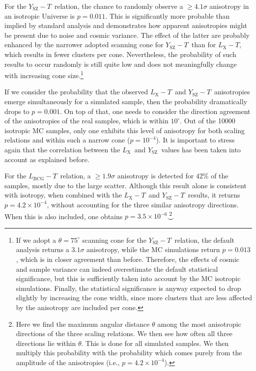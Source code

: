 \documentclass{aa}   %
\newcommand{\LT}{$L_{\text{X}}-T$}
\newcommand{\YT}{$Y_{\text{SZ}}-T$}
\newcommand{\LbcgT}{$L_{\text{BCG}}-T$}
\newcommand{\Lx}{$L_{\text{X}}$}
\newcommand{\Ysz}{$Y_{\text{SZ}}$}
\begin{document}
For the \YT\ relation, the chance to randomly observe a $\geq 4.1\sigma$ anisotropy in an isotropic Universe is $p=0.011$. This is significantly more probable than implied by standard analysis and demonstrates how apparent anisotropies might be present due to noise and cosmic variance. The effect of the latter are probably enhanced by the narrower adopted scanning cone for \YT\ than for \LT, which results in fewer clusters per cone. Nevertheless, the probability of such results to occur randomly is still quite low and does not meaningfully change with increasing cone size.\footnote{If we adopt a $\theta=75^{\circ}$ scanning cone for the \YT\ relation, the default analysis returns a $3.1\sigma$ anisotropy, while the MC simulations return $p=0.013$, which is in closer agreement than before. Therefore, the effects of cosmic and sample variance can indeed overestimate the default statistical significance, but this is sufficiently taken into account by the MC isotropic simulations. Finally, the statistical significance is anyway expected to drop slightly by increasing the cone width, since more clusters that are less affected by the anisotropy are included per cone.}

If we consider the probability that the observed \LT\ and \YT\ anisotropies emerge simultaneously for a simulated sample, then the probability dramatically drops to $p=0.001$. On top of that, one needs to consider the direction agreement of the anisotropies of the real samples, which is within $10^{\circ}$. Out of the 10000 isotropic MC samples, only one exhibits this level of anisotropy for both scaling relations and within such a narrow cone ($p=10^{-4}$). It is important to stress again that the correlation between the \Lx\ and \Ysz\ values has been taken into account as explained before. 

For the \LbcgT\ relation, a $\geq 1.9\sigma$ anisotropy is detected for $42\%$ of the samples, mostly due to the large scatter. Although this result alone is consistent with isotropy, when combined with the \LT\ and \YT\ results, it returns $p=4.2\times 10^{-4}$, without accounting for the three similar anisotropy directions. When this is also included, one obtains $p=3.5\times 10^{-6}$.\footnote{Here we find the maximum angular distance $\theta$ among the most anisotropic directions of the three scaling relations. We then see how often all three directions lie within $\theta$. This is done for all simulated samples. We then multiply this probability with the probability which comes purely from the amplitude of the anisotropies (i.e., $p=4.2\times 10^{-4}$).}.
\end{document}
